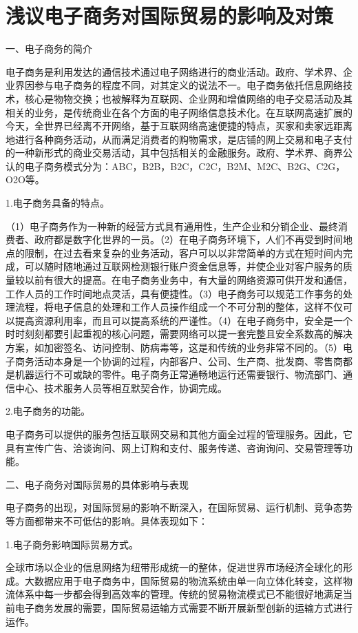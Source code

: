\chapter{浅议电子商务对国际贸易的影响及对策}
一、电子商务的简介

电子商务是利用发达的通信技术通过电子网络进行的商业活动。政府、学术界、企业界因参与电子商务的程度不同，对其定义的说法不一。电子商务依托信息网络技术，核心是物物交换；也被解释为互联网、企业网和增值网络的电子交易活动及其相关的业务，是传统商业在各个方面的电子网络信息技术化。在互联网高速扩展的今天，全世界已经离不开网络，基于互联网络高速便捷的特点，买家和卖家远距离地进行各种商务活动，从而满足消费者的购物需求，是店铺的网上交易和电子支付的一种新形式的商业交易活动，其中包括相关的金融服务。政府、学术界、商界公认的电子商务模式分为：ABC，B2B，B2C，C2C，B2M、M2C、B2G、C2G，O2O等。

1.电子商务具备的特点。

（1）电子商务作为一种新的经营方式具有通用性，生产企业和分销企业、最终消费者、政府都是数字化世界的一员。（2）在电子商务环境下，人们不再受到时间地点的限制，在过去看来复杂的业务活动，客户可以以非常简单的方式在短时间内完成，可以随时随地通过互联网检测银行账户资金信息等，并使企业对客户服务的质量较以前有很大的提高。在电子商务业务中，有大量的网络资源可供开发和通信，工作人员的工作时间地点灵活，具有便捷性。（3）电子商务可以规范工作事务的处理流程，将电子信息的处理和工作人员操作组成一个不可分割的整体，这样不仅可以提高资源利用率，而且可以提高系统的严谨性。（4）在电子商务中，安全是一个时时刻刻都要引起重视的核心问题，需要网络可以提一套完整且安全系数高的解决方案，如加密签名、访问控制、防病毒等，这是和传统的业务非常不同的。（5）电子商务活动本身是一个协调的过程，内部客户、公司、生产商、批发商、零售商都是机器运行不可或缺的零件。电子商务正常通畅地运行还需要银行、物流部门、通信中心、技术服务人员等相互默契合作，协调完成。

2.电子商务的功能。

电子商务可以提供的服务包括互联网交易和其他方面全过程的管理服务。因此，它具有宣传广告、洽谈询问、网上订购和支付、服务传递、咨询询问、交易管理等功能。

二、电子商务对国际贸易的具体影响与表现

电子商务的出现，对国际贸易的影响不断深入，在国际贸易、运行机制、竞争态势等方面都带来不可低估的影响。具体表现如下：

1.电子商务影响国际贸易方式。

全球市场以企业的信息网络为纽带形成统一的整体，促进世界市场经济全球化的形成。大数据应用于电子商务中，国际贸易的物流系统由单一向立体化转变，这样物流体系中每一步都会得到高效率的管理。传统的贸易物流模式已不能很好地满足当前电子商务发展的需要，国际贸易运输方式需要不断开展新型创新的运输方式进行运作。

